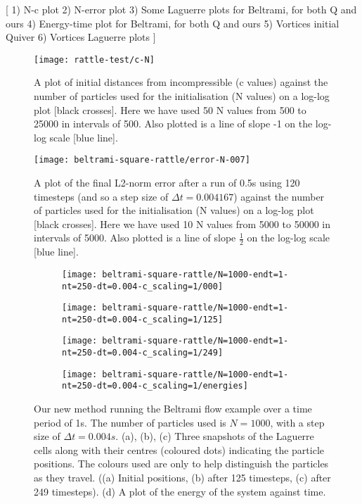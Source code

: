 \documentclass[11pt, oneside]{article}   	%
\newcommand{\dt}{\Delta t}
\begin{document}
[
1) N-c plot
2) N-error plot
3) Some Laguerre plots for Beltrami, for both Q and ours
4) Energy-time plot for Beltrami, for both Q and ours
5) Vortices initial Quiver
6) Vortices Laguerre plots
]

\begin{figure}[h]
\texttt{[image: rattle-test/c-N]}
\centering
\caption{A plot of initial distances from incompressible (c values) against the number of particles used for the initialisation (N values) on a log-log plot [black crosses]. Here we have used 50 N values from 500 to 25000 in intervals of 500. Also plotted is a line of slope -1 on the log-log scale [blue line].}
\centering
\end{figure}

\begin{figure}[h]
\texttt{[image: beltrami-square-rattle/error-N-007]}
\centering
\caption{A plot of the final L2-norm error after a run of 0.5s using 120 timesteps (and so a step size of \(\dt = 0.004167\)) against the number of particles used for the initialisation (N values) on a log-log plot [black crosses]. Here we have used 10 N values from 5000 to 50000 in intervals of 5000. Also plotted is a line of slope \(\frac{1}{2}\) on the log-log scale [blue line].}
\centering
\end{figure}

\begin{figure}[h]
   \begin{subfigure}[t]{0.45\textwidth}
        \centering
        \texttt{[image: beltrami-square-rattle/N=1000-endt=1-nt=250-dt=0.004-c\_scaling=1/000]}
        \caption{} \label{fig:timing2}
    \end{subfigure}
   \begin{subfigure}[t]{0.45\textwidth}
        \centering
        \texttt{[image: beltrami-square-rattle/N=1000-endt=1-nt=250-dt=0.004-c\_scaling=1/125]}
        \caption{} \label{fig:timing2}
    \end{subfigure}
   \begin{subfigure}[t]{0.45\textwidth}
        \centering
	\texttt{[image: beltrami-square-rattle/N=1000-endt=1-nt=250-dt=0.004-c\_scaling=1/249]}
        \caption{} \label{fig:timing2}
    \end{subfigure}
   \begin{subfigure}[t]{0.45\textwidth}
        \centering
	\texttt{[image: beltrami-square-rattle/N=1000-endt=1-nt=250-dt=0.004-c\_scaling=1/energies]}
        \caption{} \label{fig:timing2}
    \end{subfigure}
\centering
\caption{Our new method running the Beltrami flow example over a time period of 1s. The number of particles used is \(N = 1000\), with a step size of \(\dt = 0.004s\). (a), (b), (c) Three snapshots of the Laguerre cells along with their centres (coloured dots) indicating the particle positions. The colours used are only to help distinguish the particles as they travel. ((a) Initial positions, (b) after 125 timesteps, (c) after 249 timesteps). (d) A plot of the energy of the system against time. }
\centering
\end{figure}
\end{document}
